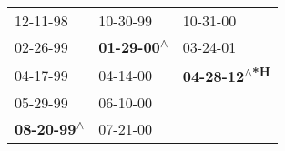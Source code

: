\begin{supertabular}{lll}
                  12-11-98\textsuperscript{} &                   10-30-99\textsuperscript{} &                     10-31-00\textsuperscript{} \\
                  02-26-99\textsuperscript{} &  \textbf{01-29-00\textsuperscript{$\wedge$}} &                     03-24-01\textsuperscript{} \\
                  04-17-99\textsuperscript{} &                   04-14-00\textsuperscript{} &  \textbf{04-28-12\textsuperscript{$\wedge$*H}} \\
                  05-29-99\textsuperscript{} &                   06-10-00\textsuperscript{} &                                                \\
 \textbf{08-20-99\textsuperscript{$\wedge$}} &                   07-21-00\textsuperscript{} &                                                \\
\end{supertabular}
